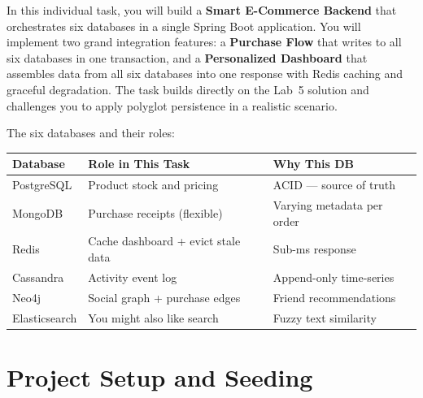 \documentclass[a4paper]{article}
\begin{document}
In this individual task, you will build a \textbf{Smart E-Commerce Backend} that orchestrates six databases in a single Spring Boot application. You will implement two grand integration features: a \textbf{Purchase Flow} that writes to all six databases in one transaction, and a \textbf{Personalized Dashboard} that assembles data from all six databases into one response with Redis caching and graceful degradation. The task builds directly on the Lab~5 solution and challenges you to apply polyglot persistence in a realistic scenario.

The six databases and their roles:
\begin{center}
\begin{tabular}{l l l}
\textbf{Database} & \textbf{Role in This Task} & \textbf{Why This DB} \\ \hline
PostgreSQL & Product stock and pricing & ACID --- source of truth \\
MongoDB & Purchase receipts (flexible) & Varying metadata per order \\
Redis & Cache dashboard + evict stale data & Sub-ms response \\
Cassandra & Activity event log & Append-only time-series \\
Neo4j & Social graph + purchase edges & Friend recommendations \\
Elasticsearch & You might also like search & Fuzzy text similarity \\
\end{tabular}
\end{center}

\section{Project Setup and Seeding}
\end{document}
